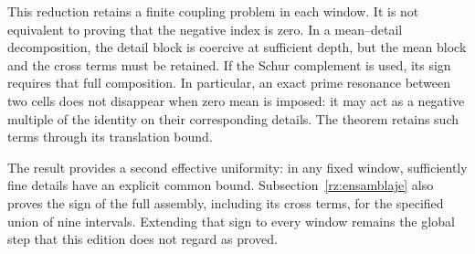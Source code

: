 This reduction retains a finite coupling problem in each window. It is not equivalent to proving that the negative index is zero. In a mean–detail decomposition, the detail block is coercive at sufficient depth, but the mean block and the cross terms must be retained. If the Schur complement is used, its sign requires that full composition. In particular, an exact prime resonance between two cells does not disappear when zero mean is imposed: it may act as a negative multiple of the identity on their corresponding details. The theorem retains such terms through its translation bound.

The result provides a second effective uniformity: in any fixed window, sufficiently fine details have an explicit common bound. Subsection~\ref{rz:ensamblaje} also proves the sign of the full assembly, including its cross terms, for the specified union of nine intervals. Extending that sign to every window remains the global step that this edition does not regard as proved.
